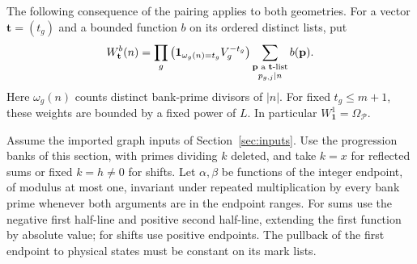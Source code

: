 The following consequence of the pairing applies to both geometries.
For a vector \(\mathbf t=(t_g)\) and a bounded function \(b\) on its
ordered distinct lists, put
\begin{equation}
 W_{\mathbf t}^b(n)=
 \prod_g\big(\mathbf 1_{\omega_g(n)=t_g}V_g^{-t_g}\big)
       \sum_{\substack{\mathbf p\text{ a }\mathbf t\text{-list}\\
                        p_{g,j}\mid n}} b(\mathbf p).
 \label{eq:gr-listweight}
\end{equation}
Here \(\omega_g(n)\) counts distinct bank-prime divisors of \(|n|\).
For fixed \(t_g\le m+1\), these weights are bounded by a fixed
power of \(L\).  In particular \(W_{\mathbf1}^1=\Omega_{\mathcal P}\).

\begin{proposition}
\label{prop:gr-arithmetic-reduction}
Assume the imported graph inputs of Section~\ref{sec:inputs}.
Use the progression banks of this section, with primes dividing
\(k\) deleted, and take \(k=x\) for reflected sums or fixed
\(k=h\ne0\) for shifts. Let \(\alpha,\beta\) be functions of the
integer endpoint, of modulus at most one, invariant under repeated
multiplication by every bank prime whenever both arguments are in
the endpoint ranges. For sums use the negative first half-line and
positive second half-line, extending the first function by absolute
value; for shifts use positive endpoints. The pullback of the first
endpoint to physical states must be constant on its mark lists.


\end{proposition}
